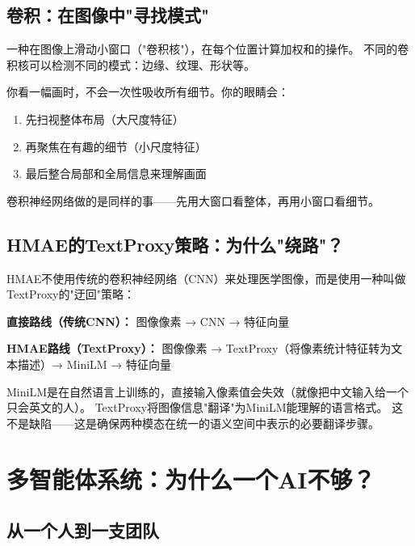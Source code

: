 \documentclass[11pt,a4paper]{ctexart}
\begin{document}
\subsection{卷积：在图像中"寻找模式"}

\begin{defbox}[卷积 (Convolution)]
一种在图像上滑动小窗口（"卷积核"），在每个位置计算加权和的操作。
不同的卷积核可以检测不同的模式：边缘、纹理、形状等。
\end{defbox}

\begin{exambox}
你看一幅画时，不会一次性吸收所有细节。你的眼睛会：
\begin{enumerate}[nosep]
\item 先扫视整体布局（大尺度特征）
\item 再聚焦在有趣的细节（小尺度特征）
\item 最后整合局部和全局信息来理解画面
\end{enumerate}
卷积神经网络做的是同样的事——先用大窗口看整体，再用小窗口看细节。
\end{exambox}

\subsection{HMAE的TextProxy策略：为什么"绕路"？}

HMAE不使用传统的卷积神经网络（CNN）来处理医学图像，而是使用一种叫做TextProxy的"迂回"策略：

\textbf{直接路线（传统CNN）：} 图像像素 → CNN → 特征向量

\textbf{HMAE路线（TextProxy）：} 图像像素 → TextProxy（将像素统计特征转为文本描述）→ MiniLM → 特征向量

\begin{keybox}[为什么"绕路"？]
MiniLM是在自然语言上训练的，直接输入像素值会失效（就像把中文输入给一个只会英文的人）。
TextProxy将图像信息"翻译"为MiniLM能理解的语言格式。
这不是缺陷——这是确保两种模态在统一的语义空间中表示的必要翻译步骤。
\end{keybox}

\newpage

\section{多智能体系统：为什么一个AI不够？}

\subsection{从一个人到一支团队}
\end{document}
